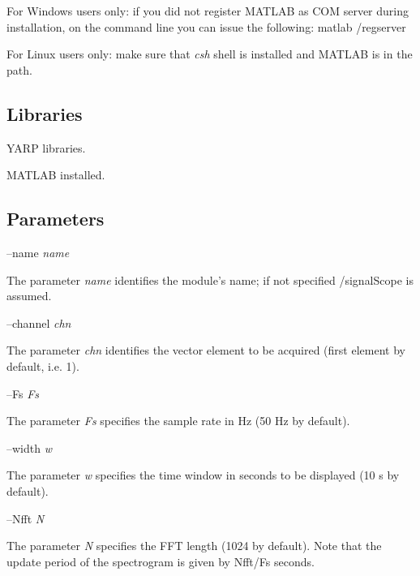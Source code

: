 For Windows users only\+: if you did not register M\+A\+T\+L\+A\+B as C\+O\+M server during installation, on the command line you can issue the following\+: matlab /regserver

For Linux users only\+: make sure that {\itshape csh} shell is installed and M\+A\+T\+L\+A\+B is in the path.\hypertarget{group__icub__tld_lib_sec}{}\subsection{Libraries}\label{group__icub__tld_lib_sec}

\begin{DoxyItemize}
\item Y\+A\+R\+P libraries.
\item M\+A\+T\+L\+A\+B installed.
\end{DoxyItemize}\hypertarget{group__icub__tld_parameters_sec}{}\subsection{Parameters}\label{group__icub__tld_parameters_sec}
--name {\itshape name} 
\begin{DoxyItemize}
\item The parameter {\itshape name} identifies the module's name; if not specified /signal\+Scope is assumed.
\end{DoxyItemize}

--channel {\itshape chn} 
\begin{DoxyItemize}
\item The parameter {\itshape chn} identifies the vector element to be acquired (first element by default, i.\+e. 1).
\end{DoxyItemize}

--Fs {\itshape Fs} 
\begin{DoxyItemize}
\item The parameter {\itshape Fs} specifies the sample rate in Hz (50 Hz by default).
\end{DoxyItemize}

--width {\itshape w} 
\begin{DoxyItemize}
\item The parameter {\itshape w} specifies the time window in seconds to be displayed (10 s by default).
\end{DoxyItemize}

--Nfft {\itshape N} 
\begin{DoxyItemize}
\item The parameter {\itshape N} specifies the F\+F\+T length (1024 by default). Note that the update period of the spectrogram is given by Nfft/\+Fs seconds.
\end{DoxyItemize}

